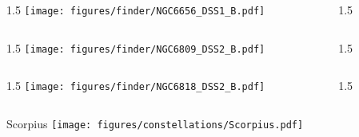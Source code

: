 \documentclass[final]{beamer}
\newlength{\colwidth}
\begin{document}

\begin{frame}[t]{}
  \begin{columns}[T]
    \begin{column}{1.5\colwidth}
      \centering
      \texttt{[image: figures/finder/NGC6656\_DSS1\_B.pdf]}
    \end{column}
    \begin{column}{1.5\colwidth}
      \Large
      
    \end{column}
  \end{columns}
  \vspace{\fill}
  \begin{columns}[T]
    \begin{column}{1.5\colwidth}
      \centering
      \texttt{[image: figures/finder/NGC6809\_DSS2\_B.pdf]}
    \end{column}
    \begin{column}{1.5\colwidth}
      \Large
      
    \end{column}
  \end{columns}
\end{frame}


\begin{frame}[t]{}
  \begin{columns}[T]
    \begin{column}{1.5\colwidth}
      \centering
      \texttt{[image: figures/finder/NGC6818\_DSS2\_B.pdf]}
    \end{column}
    \begin{column}{1.5\colwidth}
      \Large
      
    \end{column}
  \end{columns}
  \vspace{\fill}
\end{frame}


\begin{frame}[t]{\LARGE Scorpius}
  \centering
  \texttt{[image: figures/constellations/Scorpius.pdf]}
\end{frame}
\end{document}
